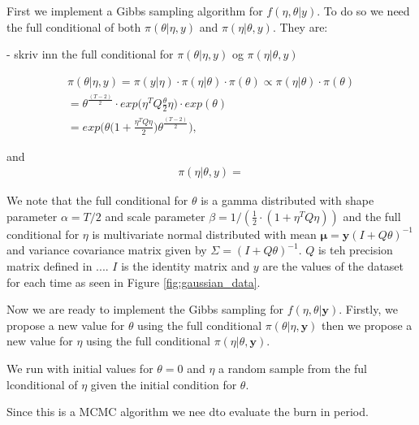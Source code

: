 First we implement a Gibbs sampling algorithm for $f(\eta, \theta |y)$. To do so we need the full conditional of both $\pi(\theta|\eta, y)$ and $\pi(\eta|\theta, y)$. They are:

- skriv inn the full conditional for $\pi(\theta|\eta, y)$ og $\pi(\eta|\theta, y)$

\begin{align}
    \pi(\theta| \eta, y) = \pi(y|\eta) \cdot \pi(\eta|\theta) \cdot \pi(\theta) \propto \pi(\eta|\theta) \cdot \pi(\theta) \nonumber \\
    = \theta^{\frac{(T-2)}{2}} \cdot exp \Big( \eta^T Q \frac{\theta}{2} \eta \Big) \cdot exp(\theta) \nonumber \\
    = exp \Big(  \theta \big(1 + \frac{\eta^T Q \eta}{2}  \big) \theta^{\frac{(T-2)}{2}}  \Big), 
\end{align}

and 
\begin{align}
    \pi(\eta | \theta, y) = 
\end{align}

We note that the full conditional for $\theta$ is a gamma distributed with shape parameter $\alpha = T/2$ and scale parameter $\beta = 1/(\frac{1}{2}\cdot (1 + \eta^T Q \eta))$ and the full conditional for $\eta$ is multivariate normal distributed with mean $\boldsymbol{\mu} = \boldsymbol{y}(I + Q \theta)^{-1}$ and variance covariance matrix given by $\Sigma = (I + Q \theta)^{-1}$. $Q$ is teh precision matrix defined in ....
$I$ is the identity matrix and $y$ are the values of the dataset for each time as seen in Figure \ref{fig:gaussian_data}. 




Now we are ready to implement the Gibbs sampling for $f(\eta, \theta | \boldsymbol{y})$. Firstly, we propose a new value for $\theta$ using the full conditional $\pi(\theta|\eta, \boldsymbol{y})$ then we propose a new value for $\eta$ using the full conditional $\pi(\eta|\theta, \boldsymbol{y})$. 



We run with initial values for $\theta = 0$ and $\eta$ a random sample from the ful lconditional of $\eta$ given the initial condition for $\theta$.



Since this is a MCMC algorithm we nee dto evaluate the burn in period. 



